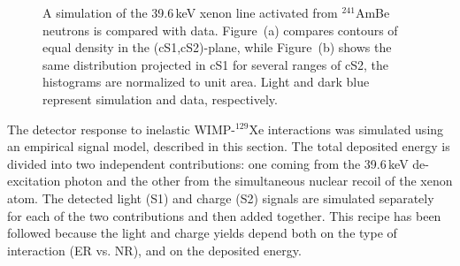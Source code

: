 \begin{figure}[t!]
	\caption{A simulation of the 39.6\,keV  xenon line activated from $^{241}$AmBe neutrons is compared with  data.
		 Figure~(a) compares contours of equal density in the (cS1,cS2)-plane, while Figure~(b) shows the same distribution projected in cS1 for
		 several ranges of cS2, the histograms are normalized to unit area. Light and dark blue represent simulation and data, respectively.
		}
		
  \label{fig:mc_comp}
\end{figure}

The detector response to inelastic WIMP-$^{129}$Xe interactions was simulated using an empirical signal model, described in this section.
The total deposited energy is divided into two independent contributions: one coming from the 39.6\,keV de-excitation photon and the other  from  
the simultaneous nuclear recoil of the xenon atom. The detected light (S1) and charge (S2) signals are simulated separately for each of the two contributions 
and then added together. This recipe has been followed  because the light and charge yields depend both on the type of interaction (ER vs. NR), and on the deposited energy.



